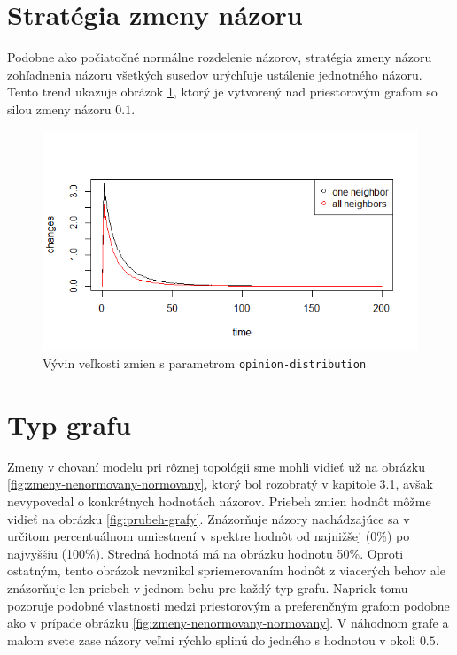 \documentclass[10pt,a4paper]{report}
\begin{document}
\section{Stratégia zmeny názoru}
Podobne ako počiatočné normálne rozdelenie názorov, stratégia zmeny názoru zohľadnenia názoru všetkých susedov urýchľuje ustálenie jednotného názoru. Tento trend ukazuje obrázok \ref{fig:zmeny-strategie}, ktorý je vytvorený nad priestorovým grafom so silou zmeny názoru $0.1$.  
\begin{figure}
  \includegraphics[width=\textwidth]{plots/random-g/randomAllVsOne.png}
  \caption{Vývin veľkosti zmien s parametrom \texttt{opinion-distribution} }
  \label{fig:zmeny-strategie}
\end{figure}

\section{Typ grafu}
Zmeny v chovaní modelu pri rôznej topológii sme mohli vidieť už na obrázku \ref{fig:zmeny-nenormovany-normovany}, ktorý bol rozobratý v kapitole 3.1, avšak nevypovedal o konkrétnych hodnotách názorov. Priebeh zmien hodnôt môžme vidieť na obrázku \ref{fig:prubeh-grafy}. Znázorňuje názory nachádzajúce sa v určitom percentuálnom umiestnení v spektre hodnôt od najnižšej (0\%) po najvyššiu (100\%). Stredná hodnotá má na obrázku hodnotu 50\%. Oproti ostatným, tento obrázok nevznikol spriemerovaním hodnôt z viacerých behov ale znázorňuje len priebeh v jednom behu pre každý typ grafu. Napriek tomu pozoruje podobné vlastnosti medzi priestorovým a preferenčným grafom podobne ako v prípade obrázku \ref{fig:zmeny-nenormovany-normovany}. V náhodnom grafe a malom svete zase názory veľmi rýchlo splinú do jedného s hodnotou v okoli $0.5$.
\end{document}
